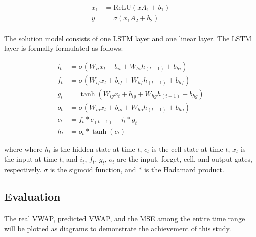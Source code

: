 \documentclass[12pt, letterpaper]{article}
\begin{document}
\begin{align*}
    x_1 & =\mathrm{ReLU}(xA_1+b_1) \\
    y   & =\sigma(x_1A_2+b_2)
\end{align*}


\paragraph{}
The solution model consists of one LSTM layer and one linear layer. The LSTM layer is formally formulated as follows:

\begin{align*}
    i_t & =\sigma(W_{ii}x_t+b_{ii}+W_{hi}h_{(t-1)}+b_{hi}) \\
    f_t & =\sigma(W_{if}x_t+b_{if}+W_{hf}h_{(t-1)}+b_{hf}) \\
    g_t & =\tanh(W_{ig}x_t+b_{ig}+W_{hg}h_{(t-1)}+b_{hg}) \\
    o_t & =\sigma(W_{io}x_t+b_{io}+W_{ho}h_{(t-1)}+b_{ho}) \\
    c_t & =f_t*c_{(t-1)}+i_t*g_t \\
    h_t & =o_t*\tanh(c_t)
\end{align*}

where where \(h_t\) is the hidden state at time \(t\), \(c_t\) is the cell state at time \(t\), \(x_t\) is the input at time \(t\), and \(i_t\), \(f_t\), \(g_t\), \(o_t\) are the input, forget, cell, and output gates, respectively. \(\sigma\) is the sigmoid function, and \(*\) is the Hadamard product.

\subsection{Evaluation}

\paragraph{}
The real VWAP, predicted VWAP, and the MSE among the entire time range will be plotted as diagrams to demonstrate the achievement of this study.
\end{document}
